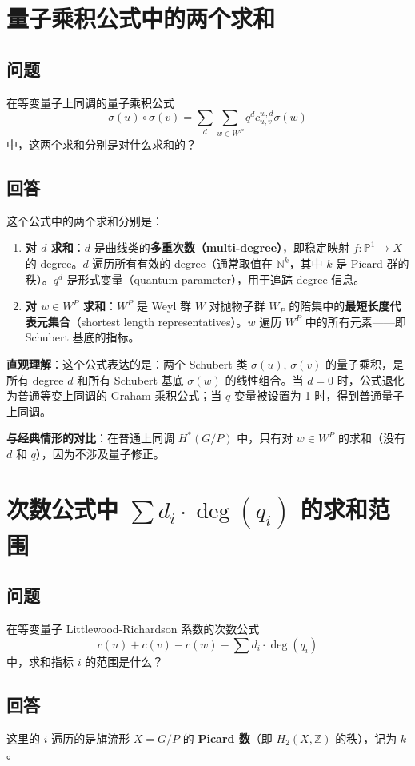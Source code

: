 \section{量子乘积公式中的两个求和}\label{sec:qa-eqc-summations}
\subsection{问题}
在等变量子上同调的量子乘积公式
$$\sigma(u) \circ \sigma(v) = \sum_{d} \sum_{w \in W^P} q^d c_{u,v}^{w,d} \sigma(w)$$
中，这两个求和分别是对什么求和的？
\subsection{回答}
这个公式中的两个求和分别是：

\begin{enumerate}
\item \textbf{对 $d$ 求和}：$d$ 是曲线类的\textbf{多重次数（multi-degree）}，即稳定映射 $f: \mathbb{P}^1 \to X$ 的 degree。$d$ 遍历所有有效的 degree（通常取值在 $\mathbb{N}^k$，其中 $k$ 是 Picard 群的秩）。$q^d$ 是形式变量（quantum parameter），用于追踪 degree 信息。

\item \textbf{对 $w \in W^P$ 求和}：$W^P$ 是 Weyl 群 $W$ 对抛物子群 $W_P$ 的陪集中的\textbf{最短长度代表元集合}（shortest length representatives）。$w$ 遍历 $W^P$ 中的所有元素——即 Schubert 基底的指标。
\end{enumerate}

\textbf{直观理解}：这个公式表达的是：两个 Schubert 类 $\sigma(u)$, $\sigma(v)$ 的量子乘积，是所有 degree $d$ 和所有 Schubert 基底 $\sigma(w)$ 的线性组合。当 $d = 0$ 时，公式退化为普通等变上同调的 Graham 乘积公式；当 $q$ 变量被设置为 1 时，得到普通量子上同调。

\textbf{与经典情形的对比}：在普通上同调 $H^*(G/P)$ 中，只有对 $w \in W^P$ 的求和（没有 $d$ 和 $q$），因为不涉及量子修正。

\section{次数公式中 $\sum d_i \cdot \deg(q_i)$ 的求和范围}\label{sec:qa-degree-summation-range}
\subsection{问题}
在等变量子 Littlewood-Richardson 系数的次数公式
$$c(u) + c(v) - c(w) - \sum d_i \cdot \deg(q_i)$$
中，求和指标 $i$ 的范围是什么？
\subsection{回答}
这里的 $i$ 遍历的是旗流形 $X = G/P$ 的 \textbf{Picard 数}（即 $H_2(X,\mathbb{Z})$ 的秩），记为 $k$。

